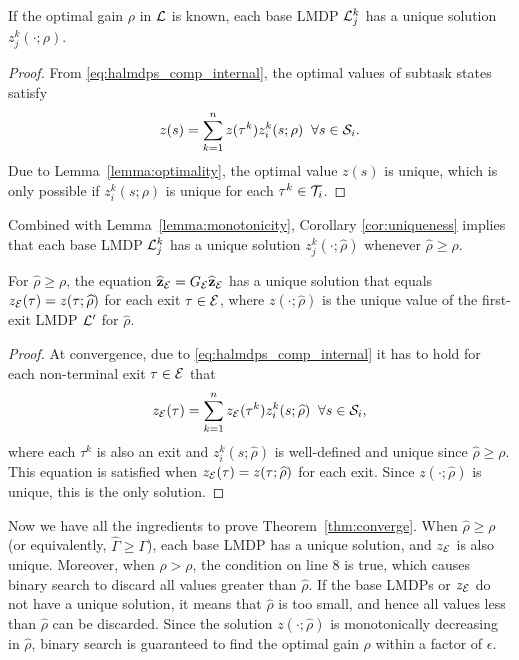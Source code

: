 \begin{corollary}\label{cor:uniqueness}
    If the optimal gain $\rho$ in $\mathcal{L}$ is known, each base LMDP $\mathcal{L}_j^k$ has a unique solution $z_j^k(\cdot;\rho)$.
\end{corollary}

\begin{proof} From \eqref{eq:halmdps_comp_internal}, the optimal values of subtask states satisfy
\[
  z(s) = \sum_{k=1}^n z(\tau^k) z_i^k(s;\rho)\;\;\forall s\in\mathcal{S}_i.
\]
Due to Lemma~\ref{lemma:optimality}, the optimal value $z(s)$ is unique, which is only possible if $z_i^k(s;\rho)$ is unique for each $\tau^k\in\mathcal{T}_i$.
\end{proof}

Combined with Lemma~\ref{lemma:monotonicity}, Corollary \ref{cor:uniqueness} implies that each base LMDP $\mathcal{L}_j^k$ has a unique solution $z_j^k(\cdot;\widehat\rho)$ whenever $\widehat\rho\geq\rho$.

\begin{lemma}
For $\widehat\rho\geq\rho$, the equation ${\bf \widehat z_{\mathcal{E}}} = G_{\mathcal{E}} {\bf\widehat z_{\mathcal{E}}}$ has a unique solution that equals $z_{\mathcal{E}}(\tau)=z(\tau;\widehat\rho)$ for each exit $\tau\in\mathcal{E}$, where $z(\cdot;\widehat\rho)$ is the unique value of the first-exit LMDP $\mathcal{L}'$ for $\widehat\rho$.
\end{lemma}

\begin{proof}
At convergence, due to \eqref{eq:halmdps_comp_internal} it has to hold for each non-terminal exit $\tau\in\mathcal{E}$ that
\[
  z_{\mathcal{E}}(\tau) = \sum_{k=1}^n z_{\mathcal{E}}(\tau^k) z_i^k(s;\widehat\rho)\;\;\forall s\in\mathcal{S}_i,
\]
where each $\tau^k$ is also an exit and $z_i^k(s;\widehat\rho)$ is well-defined and unique since $\widehat\rho\geq\rho$. This equation is satisfied when $z_{\mathcal{E}}(\tau)=z(\tau;\widehat\rho)$ for each exit. Since $z(\cdot;\widehat\rho)$ is unique, this is the only solution.
\end{proof}

Now we have all the ingredients to prove Theorem~\ref{thm:converge}. When $\widehat\rho\geq\rho$ (or equivalently, $\widehat\Gamma\geq\Gamma$), each base LMDP has a unique solution, and $z_{\mathcal{E}}$ is also unique. Moreover, when $\widehat\rho>\rho$, the condition on line 8 is true, which causes binary search to discard all values greater than $\widehat\rho$. If the base LMDPs or $z_{\mathcal{E}}$ do not have a unique solution, it means that $\widehat\rho$ is too small, and hence all values less than $\widehat\rho$ can be discarded. Since the solution $z(\cdot;\widehat\rho)$ is monotonically decreasing in $\widehat\rho$, binary search is guaranteed to find the optimal gain $\rho$ within a factor of $\epsilon$.

